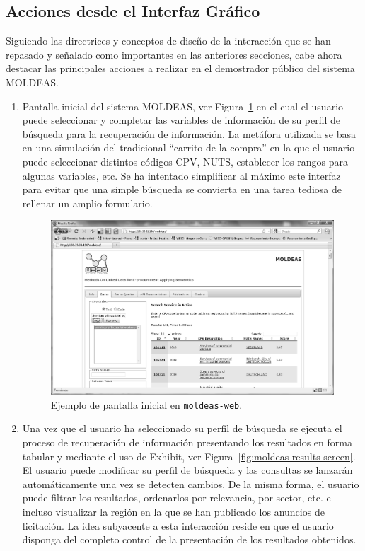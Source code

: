 \subsection{Acciones desde el Interfaz Gráfico}
Siguiendo las directrices y conceptos de diseño de la interacción que se han 
repasado y señalado como importantes en las anteriores secciones, cabe ahora 
destacar las principales acciones a realizar en el demostrador público 
del sistema \gls{MOLDEAS}.

\begin{enumerate}
 \item Pantalla inicial del sistema MOLDEAS, ver Figura~\ref{fig:moldeas-web-screen} en el cual el usuario puede 
seleccionar y completar las variables de información de su perfil 
de búsqueda para la recuperación de información. La metáfora utilizada 
se basa en una simulación del tradicional ``carrito de la compra'' en la que 
el usuario puede seleccionar distintos códigos \gls{CPV}, \gls{NUTS}, establecer 
los rangos para algunas variables, etc. Se ha intentado simplificar 
al máximo este interfaz para evitar que una simple búsqueda se convierta 
en una tarea tediosa de rellenar un amplio formulario.

\begin{figure}[!htb]
\centering
	\includegraphics[width=14cm]{images/phd/moldeas/moldeas-web}
\caption{Ejemplo de pantalla inicial en \texttt{moldeas-web}.}
\label{fig:moldeas-web-screen}
\end{figure}


\item Una vez que el usuario ha seleccionado su perfil de búsqueda se ejecuta 
el proceso de recuperación de información presentando los resultados en forma 
tabular y mediante el uso de Exhibit, ver Figura~\ref{fig:moldeas-results-screen}. El usuario 
puede modificar su perfil de búsqueda y las consultas se lanzarán automáticamente una 
vez se detecten cambios. De la misma forma, el usuario puede filtrar los resultados, 
ordenarlos por relevancia, por sector, etc. e incluso visualizar la región en la 
que se han publicado los anuncios de licitación. La idea subyacente a esta 
interacción reside en que el usuario disponga del completo control de la presentación 
de los resultados obtenidos.



\end{enumerate}
